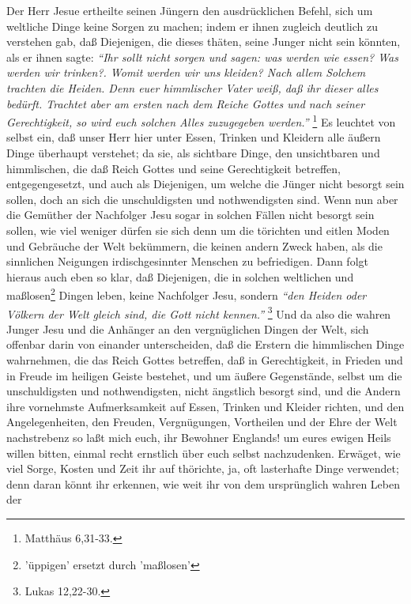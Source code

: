 Der Herr Jesue ertheilte seinen Jüngern den ausdrücklichen Befehl, sich um
weltliche Dinge keine Sorgen zu machen; indem er ihnen zugleich deutlich zu
verstehen gab, daß Diejenigen, die dieses thäten, seine Junger nicht sein
könnten, als er ihnen sagte:
\textit{"`Ihr sollt nicht sorgen und sagen: was werden wie
essen? Was werden wir trinken?. Womit werden wir uns kleiden? Nach allem Solchem
trachten die Heiden. Denn euer himmlischer Vater weiß, daß ihr dieser alles
bedürft. Trachtet aber am ersten nach dem Reiche Gottes und nach seiner
Gerechtigkeit, so wird euch solchen Alles zuzugegeben werden."'}
\footnote{Matthäus 6,31-33.}
Es leuchtet von selbst ein, daß unser Herr hier unter Essen,
Trinken und Kleidern alle äußern Dinge überhaupt verstehet; da sie, als
sichtbare Dinge, den unsichtbaren und himmlischen, die daß Reich Gottes und
seine Gerechtigkeit betreffen, entgegengesetzt, und auch als Diejenigen, um
welche die Jünger nicht besorgt sein sollen, doch an sich die unschuldigsten und
nothwendigsten sind. Wenn nun aber die Gemüther der Nachfolger Jesu sogar in
solchen Fällen nicht besorgt sein sollen, wie viel weniger dürfen sie sich denn
um die törichten und eitlen Moden und Gebräuche der Welt bekümmern, die keinen
andern Zweck haben, als die sinnlichen Neigungen irdischgesinnter Menschen zu
befriedigen. Dann folgt hieraus auch eben so klar, daß Diejenigen, die in
solchen weltlichen und maßlosen\footnote{'üppigen' ersetzt durch 'maßlosen'} Dingen leben, keine Nachfolger Jesu, sondern
\textit{"`den Heiden oder Völkern der Welt gleich sind, die Gott nicht
kennen."'}
\footnote{Lukas 12,22-30.}
Und da also die wahren Junger Jesu und die
Anhänger an den vergnüglichen Dingen der Welt, sich offenbar darin von einander
unterscheiden, daß die Erstern die himmlischen Dinge wahrnehmen, die das Reich
Gottes betreffen, daß in Gerechtigkeit, in Frieden und in Freude im heiligen
Geiste bestehet, und um äußere Gegenstände, selbst um die unschuldigsten und
nothwendigsten, nicht ängstlich besorgt sind, und die Andern ihre vornehmste
Aufmerksamkeit auf Essen, Trinken und Kleider richten, und den Angelegenheiten,
den Freuden, Vergnügungen, Vortheilen und der Ehre der Welt nachstrebenz so laßt
mich euch, ihr Bewohner Englands! um eures ewigen Heils willen bitten, einmal
recht ernstlich über euch selbst nachzudenken. Erwäget, wie viel Sorge, Kosten
und Zeit ihr auf thörichte, ja, oft lasterhafte Dinge verwendet; denn daran
könnt ihr erkennen, wie weit ihr von dem ursprünglich wahren Leben der
